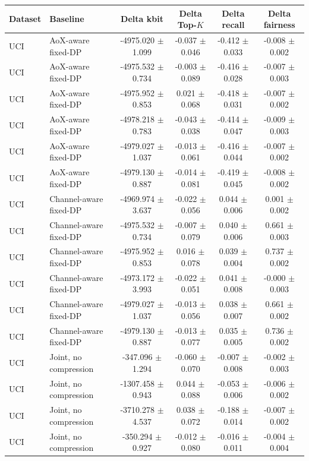 \begin{tabular}{llcccc}
\toprule
Dataset & Baseline & Delta kbit & Delta Top-$K$ & Delta recall & Delta fairness \\
\midrule
UCI & AoX-aware fixed-DP & -4975.020 $\pm$ 1.099 & -0.037 $\pm$ 0.046 & -0.412 $\pm$ 0.033 & -0.008 $\pm$ 0.002 \\
UCI & AoX-aware fixed-DP & -4975.532 $\pm$ 0.734 & -0.003 $\pm$ 0.089 & -0.416 $\pm$ 0.028 & -0.007 $\pm$ 0.003 \\
UCI & AoX-aware fixed-DP & -4975.952 $\pm$ 0.853 & 0.021 $\pm$ 0.068 & -0.418 $\pm$ 0.031 & -0.007 $\pm$ 0.002 \\
UCI & AoX-aware fixed-DP & -4978.218 $\pm$ 0.783 & -0.043 $\pm$ 0.038 & -0.414 $\pm$ 0.047 & -0.009 $\pm$ 0.003 \\
UCI & AoX-aware fixed-DP & -4979.027 $\pm$ 1.037 & -0.013 $\pm$ 0.061 & -0.416 $\pm$ 0.044 & -0.007 $\pm$ 0.002 \\
UCI & AoX-aware fixed-DP & -4979.130 $\pm$ 0.887 & -0.014 $\pm$ 0.081 & -0.419 $\pm$ 0.045 & -0.008 $\pm$ 0.002 \\
UCI & Channel-aware fixed-DP & -4969.974 $\pm$ 3.637 & -0.022 $\pm$ 0.056 & 0.044 $\pm$ 0.006 & 0.001 $\pm$ 0.002 \\
UCI & Channel-aware fixed-DP & -4975.532 $\pm$ 0.734 & -0.007 $\pm$ 0.079 & 0.040 $\pm$ 0.006 & 0.661 $\pm$ 0.003 \\
UCI & Channel-aware fixed-DP & -4975.952 $\pm$ 0.853 & 0.016 $\pm$ 0.078 & 0.039 $\pm$ 0.004 & 0.737 $\pm$ 0.002 \\
UCI & Channel-aware fixed-DP & -4973.172 $\pm$ 3.993 & -0.022 $\pm$ 0.051 & 0.041 $\pm$ 0.008 & -0.000 $\pm$ 0.003 \\
UCI & Channel-aware fixed-DP & -4979.027 $\pm$ 1.037 & -0.013 $\pm$ 0.056 & 0.038 $\pm$ 0.007 & 0.661 $\pm$ 0.002 \\
UCI & Channel-aware fixed-DP & -4979.130 $\pm$ 0.887 & -0.013 $\pm$ 0.077 & 0.035 $\pm$ 0.005 & 0.736 $\pm$ 0.002 \\
UCI & Joint, no compression & -347.096 $\pm$ 1.294 & -0.060 $\pm$ 0.070 & -0.007 $\pm$ 0.008 & -0.002 $\pm$ 0.003 \\
UCI & Joint, no compression & -1307.458 $\pm$ 0.943 & 0.044 $\pm$ 0.088 & -0.053 $\pm$ 0.006 & -0.006 $\pm$ 0.002 \\
UCI & Joint, no compression & -3710.278 $\pm$ 4.537 & 0.038 $\pm$ 0.072 & -0.188 $\pm$ 0.014 & -0.007 $\pm$ 0.002 \\
UCI & Joint, no compression & -350.294 $\pm$ 0.927 & -0.012 $\pm$ 0.080 & -0.016 $\pm$ 0.011 & -0.004 $\pm$ 0.004 \\

\end{tabular}
